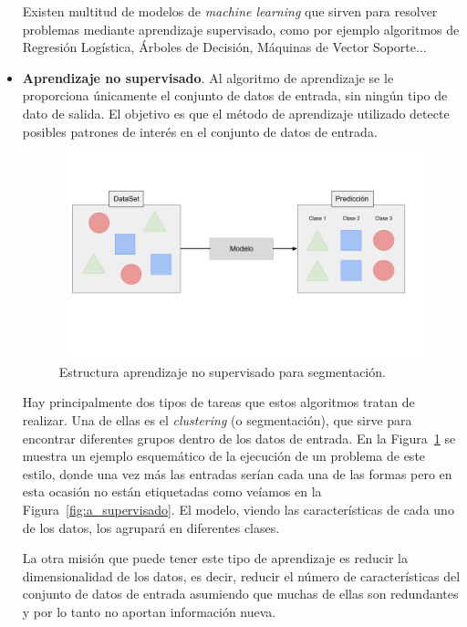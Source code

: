 \documentclass[a4paper, 12pt]{book}
\begin{document}
\begin{itemize}
    Existen multitud de modelos de \textit{machine learning} que sirven para resolver problemas mediante aprendizaje supervisado, como por ejemplo algoritmos de Regresión Logística, Árboles de Decisión, Máquinas de Vector Soporte...
    
    \item \textbf{Aprendizaje no supervisado}. Al algoritmo de aprendizaje se le proporciona únicamente el conjunto de datos de entrada, sin ningún tipo de dato de salida. El objetivo es que el método de aprendizaje utilizado detecte posibles patrones de interés en el conjunto de datos de entrada. 
    
    \begin{figure}[htb]
      \centering
      \includegraphics[width=12cm, keepaspectratio]{img/a_no_supervisado.png}
      \caption{Estructura aprendizaje no supervisado para segmentación.}\label{fig:a_no_supervisado}
    \end{figure}
    
    Hay principalmente dos tipos de tareas que estos algoritmos tratan de realizar. Una de ellas es el \textit{clustering} (o segmentación), que sirve para encontrar diferentes grupos dentro de los datos de entrada. En la Figura~\ref{fig:a_no_supervisado} se muestra un ejemplo esquemático de la ejecución de un problema de este estilo, donde una vez más las entradas serían cada una de las formas pero en esta ocasión no están etiquetadas como veíamos en la Figura~\ref{fig:a_supervisado}. El modelo, viendo las características de cada uno de los datos, los agrupará en diferentes clases.
    
    La otra misión que puede tener este tipo de aprendizaje es reducir la dimensionalidad de los datos, es decir, reducir el número de características del conjunto de datos de entrada asumiendo que muchas de ellas son redundantes y por lo tanto no aportan información nueva.
    

\end{itemize}
\end{document}
